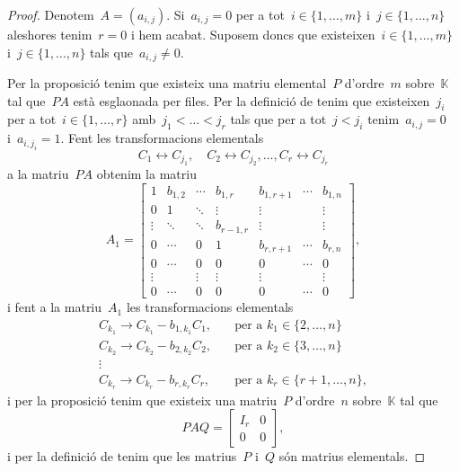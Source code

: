 \documentclass[../algebra-lineal.tex]{subfiles}
\begin{document}
    \begin{proof}
        Denotem~\(A=(a_{i,j})\).
        Si~\(a_{i,j}=0\) per a tot~\(i\in\{1,\dots,m\}\) i~\(j\in\{1,\dots,n\}\) aleshores tenim~\(r=0\) i hem acabat.
        Suposem doncs que existeixen~\(i\in\{1,\dots,m\}\) i~\(j\in\{1,\dots,n\}\) tals que~\(a_{i,j}\neq0\).

        Per la proposició  tenim que existeix una matriu elemental~\(P\) d'ordre~\(m\) sobre~\(\mathbb{K}\) tal que~\(PA\) està esglaonada per files.
        Per la definició de  tenim que existeixen~\(j_{i}\) per a tot~\(i\in\{1,\dots,r\}\) amb~\(j_{1}<\dots<j_{r}\) tals que per a tot~\(j<j_{i}\) tenim~\(a_{i,j}=0\) i~\(a_{i,j_{i}}=1\).
        Fent les transformacions elementals
        \[
            C_{1}\leftrightarrow C_{j_{1}},\quad C_{2}\leftrightarrow C_{j_{2}},\dots,C_{r}\leftrightarrow C_{j_{r}}
        \]
        a la matriu~\(PA\) obtenim la matriu
        \[A_{1}=\left[\begin{array}{cccc|ccc}
        1 & b_{1,2} & \cdots & b_{1,r} & b_{1,r+1} & \cdots & b_{1,n} \\
        0 & 1 & \ddots & \vdots & \vdots & & \vdots\\
        \vdots & \ddots & \ddots & b_{r-1,r} & \vdots & & \vdots \\
        0 & \cdots & 0 & 1 & b_{r,r+1} & \cdots & b_{r,n} \\\hline
        0 & \cdots & 0 & 0 & 0 & \cdots & 0 \\
        \vdots & & \vdots & \vdots & \vdots & & \vdots \\
        0 & \cdots & 0 & 0 & 0 & \cdots & 0
        \end{array}\right],\]
        i fent a la matriu~\(A_{1}\) les transformacions elementals
        \begin{align*}
        C_{k_{1}}\rightarrow C_{k_{1}}-b_{1,k_{1}}C_{1},\quad&\text{per a }k_{1}\in\{2,\dots,n\} \\
        C_{k_{2}}\rightarrow C_{k_{2}}-b_{2,k_{2}}C_{2},\quad&\text{per a }k_{2}\in\{3,\dots,n\} \\
        \vdots & \\
        C_{k_{r}}\rightarrow C_{k_{r}}-b_{r,k_{r}}C_{r},\quad&\text{per a }k_{r}\in\{r+1,\dots,n\},
        \end{align*}
        i per la proposició  tenim que existeix una matriu~\(P\) d'ordre~\(n\) sobre~\(\mathbb{K}\) tal que
        \[PAQ=\left[\begin{array}{c|c}
        I_{r} & 0\\\hline
        0 & 0
        \end{array}\right],\]
        i per la definició de  tenim que les matrius~\(P\) i~\(Q\) són matrius elementals.


\end{proof}
\end{document}
